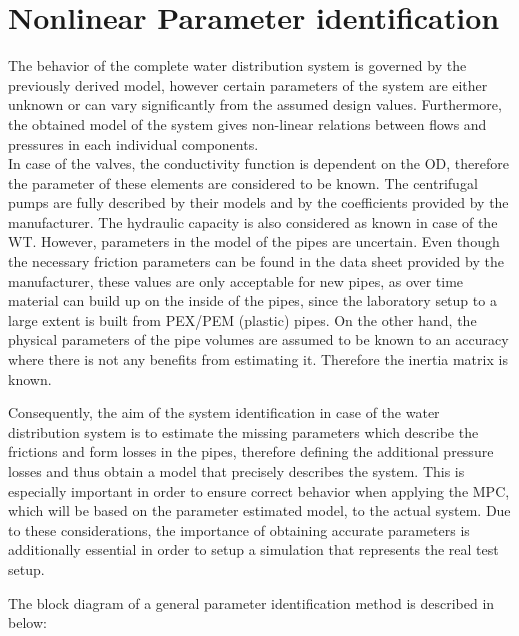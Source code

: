 \section{Nonlinear Parameter identification}
\label{SubSecEstimation}

The behavior of the complete water distribution system is governed by the previously derived model, however certain parameters of the system are either unknown or can vary significantly from the assumed design values. Furthermore, the obtained model of the system gives non-linear relations between flows and pressures in each individual components. 
\\
In case of the valves, the conductivity function is dependent on the OD, therefore the parameter of these elements are considered to be known. The centrifugal pumps are fully described by their models and by the coefficients provided by the manufacturer. The hydraulic capacity is also considered as known in case of the WT. However, parameters in the model of the pipes are uncertain. Even though the necessary friction parameters can be found in the data sheet provided by the manufacturer, these values are only acceptable for new pipes, as over time material can build up on the inside of the pipes, since the laboratory setup to a large extent is built from PEX/PEM (plastic) pipes. On the other hand, the physical parameters of the pipe volumes are assumed to be known to an accuracy where there is not any benefits from estimating it. Therefore the inertia matrix is known.  

Consequently, the aim of the system identification in case of the water distribution system is to estimate the missing parameters which describe the frictions and form losses in the pipes, therefore defining the additional pressure losses and thus obtain a model that precisely describes the system. This is especially important in order to ensure correct behavior when applying the MPC, which will be based on the parameter estimated model, to the actual system. Due to these considerations, the importance of obtaining accurate parameters is additionally essential in order to setup a simulation that represents the real test setup. 


The block diagram of a general parameter identification method is described in  below: 

